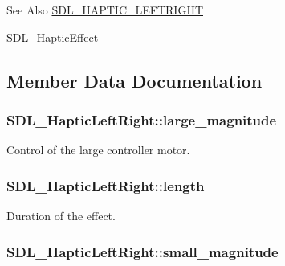 \begin{DoxySeeAlso}{See Also}
\hyperlink{_s_d_l__haptic_8h_ae047624d8458ff6400887c37a36f86d3}{S\-D\-L\-\_\-\-H\-A\-P\-T\-I\-C\-\_\-\-L\-E\-F\-T\-R\-I\-G\-H\-T} 

\hyperlink{union_s_d_l___haptic_effect}{S\-D\-L\-\_\-\-Haptic\-Effect} 
\end{DoxySeeAlso}


\subsection{Member Data Documentation}
\hypertarget{struct_s_d_l___haptic_left_right_a8cd16fe2200ef10cc4f3b4209adef959}{
\subsubsection[{large\-\_\-magnitude}]{ S\-D\-L\-\_\-\-Haptic\-Left\-Right\-::large\-\_\-magnitude}}\label{struct_s_d_l___haptic_left_right_a8cd16fe2200ef10cc4f3b4209adef959}
Control of the large controller motor. \hypertarget{struct_s_d_l___haptic_left_right_a5b942fee53f1ec77d3fb91a6e89b0196}{
\subsubsection[{length}]{ S\-D\-L\-\_\-\-Haptic\-Left\-Right\-::length}}\label{struct_s_d_l___haptic_left_right_a5b942fee53f1ec77d3fb91a6e89b0196}
Duration of the effect. \hypertarget{struct_s_d_l___haptic_left_right_aaa1f2c1e767a780e447d82efce6cd1cf}{
\subsubsection[{small\-\_\-magnitude}]{ S\-D\-L\-\_\-\-Haptic\-Left\-Right\-::small\-\_\-magnitude}}\label{struct_s_d_l___haptic_left_right_aaa1f2c1e767a780e447d82efce6cd1cf}
